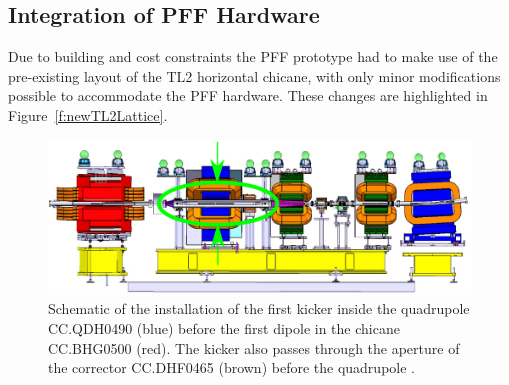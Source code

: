 \subsection{Integration of PFF Hardware}
\label{ss:tl2PFFIntegration}

Due to building and cost constraints the PFF prototype had to make use of the pre-existing layout of the TL2 horizontal chicane, with only minor modifications possible to accommodate the PFF hardware. These changes are highlighted in Figure~\ref{f:newTL2Lattice}.

\begin{figure}
  \centering
  \includegraphics[width=\textwidth]{Figures/optics/kickerInsideQuad}
  \caption{Schematic of the installation of the first kicker inside the quadrupole CC.QDH0490 (blue) before the first dipole in the chicane CC.BHG0500 (red). The kicker also passes through the aperture of the corrector CC.DHF0465 (brown) before the quadrupole \cite{kickInQuad}.}
  \label{f:kickerInsideQuad}
\end{figure}


